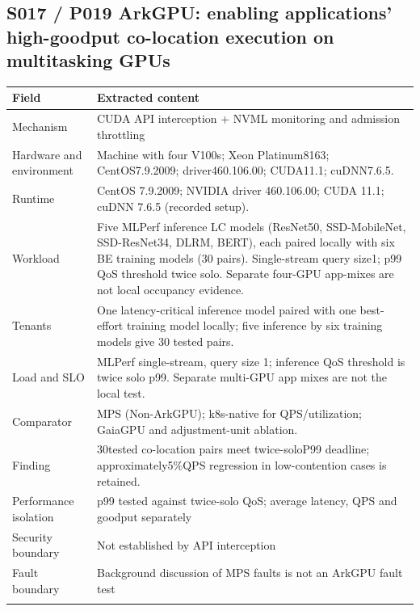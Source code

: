 \clearpage\subsection{S017 / P019 ArkGPU: enabling applications' high-goodput co-location execution on multitasking GPUs}

\cite{P019}

\begin{longtable}{>{\raggedright\arraybackslash}p{}>{\raggedright\arraybackslash}p{}}
\toprule
\textbf{Field} & \textbf{Extracted content}\\\midrule\endhead
Mechanism & CUDA API interception + NVML monitoring and admission throttling\\\addlinespace
Hardware and environment & Machine with four V100s; Xeon Platinum8163; CentOS7.9.2009; driver460.106.00; CUDA11.1; cuDNN7.6.5.\\\addlinespace
Runtime & CentOS 7.9.2009; NVIDIA driver 460.106.00; CUDA 11.1; cuDNN 7.6.5 (recorded setup).\\\addlinespace
Workload & Five MLPerf inference LC models (ResNet50, SSD-MobileNet, SSD-ResNet34, DLRM, BERT), each paired locally with six BE training models (30 pairs). Single-stream query size1; p99 QoS threshold twice solo. Separate four-GPU app-mixes are not local occupancy evidence.\\\addlinespace
Tenants & One latency-critical inference model paired with one best-effort training model locally; five inference by six training models give 30 tested pairs.\\\addlinespace
Load and SLO & MLPerf single-stream, query size 1; inference QoS threshold is twice solo p99. Separate multi-GPU app mixes are not the local test.\\\addlinespace
Comparator & MPS (Non-ArkGPU); k8s-native for QPS/utilization; GaiaGPU and adjustment-unit ablation.\\\addlinespace
Finding & 30tested co-location pairs meet twice-soloP99 deadline; approximately5\%QPS regression in low-contention cases is retained.\\\addlinespace
Performance isolation & p99 tested against twice-solo QoS; average latency, QPS and goodput separately\\\addlinespace
Security boundary & Not established by API interception\\\addlinespace
Fault boundary & Background discussion of MPS faults is not an ArkGPU fault test\\\addlinespace

\end{longtable}
